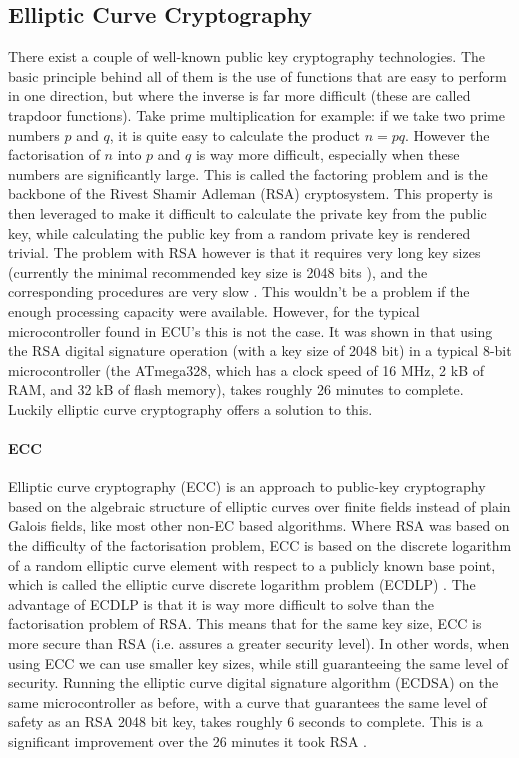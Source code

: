 \subsection{Elliptic Curve Cryptography}
\label{subsec:ECC}

There exist a couple of well-known public key cryptography technologies. The basic principle behind all of them is the use of functions that are easy to perform in one direction, but where the inverse is far more difficult (these are called trapdoor functions). Take prime multiplication for example: if we take two prime numbers $p$ and $q$, it is quite easy to calculate the product $n=pq$. However the factorisation of $n$ into $p$ and $q$ is way more difficult, especially when these numbers are significantly large. This is called the factoring problem and is the backbone of the Rivest Shamir Adleman (RSA) cryptosystem. This property is then leveraged to make it difficult to calculate the private key from the public key, while calculating the public key from a random private key is rendered trivial. The problem with RSA however is that it requires very long key sizes (currently the minimal recommended key size is 2048 bits \cite{RSAlength}), and the corresponding procedures are very slow \cite{wiki:RSA}. This wouldn't be a problem if the enough processing capacity were available. However, for the typical microcontroller found in ECU's this is not the case. It was shown in \cite{Sethi} that using the RSA digital signature operation (with a key size of 2048 bit) in a typical 8-bit microcontroller (the ATmega328, which has a clock speed of 16 MHz, 2 kB of RAM, and 32 kB of flash memory), takes roughly 26 minutes to complete. Luckily elliptic curve cryptography offers a solution to this.

\paragraph{ECC} Elliptic curve cryptography (ECC) is an approach to public-key cryptography based on the algebraic structure of elliptic curves over finite fields instead of plain Galois fields, like most other non-EC based algorithms. Where RSA was based on the difficulty of the factorisation problem, ECC is based on the discrete logarithm of a random elliptic curve element with respect to a publicly known base point, which is called the elliptic curve discrete logarithm problem (ECDLP) \cite{Siddiqui}. The advantage of ECDLP is that it is way more difficult to solve than the factorisation problem of RSA. This means that for the same key size, ECC is more secure than RSA (i.e. assures a greater security level). In other words, when using ECC we can use smaller key sizes, while still guaranteeing the same level of security. Running the elliptic curve digital signature algorithm (ECDSA) on the same microcontroller as before, with a curve that guarantees the same level of safety as an RSA 2048 bit key, takes roughly 6 seconds to complete. This is a significant improvement over the 26 minutes it took RSA \cite{Sethi}.

